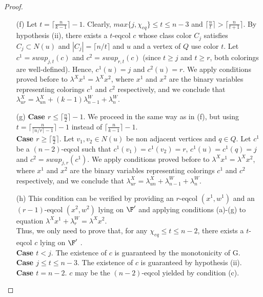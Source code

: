 \begin{proof}
\begin{enumerate}
\item[(f)] Let $t = \lceil \frac{n}{k - 1} \rceil - 1$. Clearly, $max \{ j, \chi_{eq} \} \leq t \leq n - 3$ and
$\lceil \frac{n}{t} \rceil > \lceil \frac{n}{t+1} \rceil$. By hypothesis (ii), there exists a $t$-eqcol $c$ whose
class color $C_j$ satisfies $C_j \subset N(u)$ and $|C_j| = \lceil n/t \rceil$ and $u$ and a vertex of $Q$ use
color $t$. Let $c^1 = swap_{j,t}(c)$ and $c^2 = swap_{r,t}(c)$ (since $t \geq j$ and $t \geq r$, both colorings are
well-defined). Hence, $c^1(u) = j$ and $c^2(u) = r$. We apply conditions proved before to
$\lambda^X x^1 = \lambda^X x^2$, where $x^1$ and $x^2$ are the binary variables representing colorings
$c^1$ and $c^2$ respectively, and we conclude that
$\lambda^X_{ur} = \lambda^X_{un} + (k - 1) \lambda^W_{n-1} + \lambda^W_n$.
\item[(g)] \textbf{Case $r \leq \lceil \frac{n}{2} \rceil-1$}. We proceed in the same way as in (f), but using
$t = \lceil \frac{n}{\lceil n/r \rceil - 1} \rceil - 1$ instead of
$\lceil \frac{n}{k - 1} \rceil - 1$.\\
\textbf{Case $r \geq \lceil \frac{n}{2} \rceil$}. Let $v_1, v_2 \in N(u)$ be non adjacent vertices and $q \in Q$. Let $c^1$ be a $(n-2)$-eqcol such that
$c^1(v_1) = c^1(v_2) = r$, $c^1(u) = c^1(q) = j$ and $c^2 = swap_{j,r}(c^1)$. We apply conditions proved before
to $\lambda^X x^1 = \lambda^X x^2$, where $x^1$ and $x^2$ are the binary variables representing colorings
$c^1$ and $c^2$ respectively, and we conclude that $\lambda^X_{ur} = \lambda^X_{un} + \lambda^W_{n-1} + \lambda^W_n$.
\item[(h)] This condition can be verified by providing an $r$-eqcol $(x^1,w^1)$ and an $(r-1)$-eqcol
$(x^2,w^2)$ lying on $\F'$ and applying conditions (a)-(g) to equation $\lambda^X x^1 + \lambda^W_r = \lambda^X x^2$.\\
Thus, we only need to prove that, for any $\chi_{eq} \leq t \leq n-2$, there exists a $t$-eqcol $c$ lying on $\F'$ .\\ 
\textbf{Case $t < j$}. The existence of $c$ is guaranteed by the monotonicity of G.\\
\textbf{Case $j \leq t \leq n-3$}. The existence of $c$ is guaranteed by hypothesis (ii).\\
\textbf{Case $t=n-2$}. $c$ may be the $(n-2)$-eqcol yielded by condition (c).
\end{enumerate}
\end{proof}

